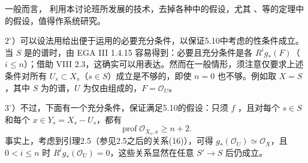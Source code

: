 一般而言，
利用本讨论班所发展的技术，去掉各种中的假设，尤其 、等的定理中的假设，值得作系统研究。

$2^\circ$）可以设法用给出便于运用的必要充分条件，以保证5.10中考虑的性条件成立。当 $S$ 是的谱时，由 EGA III 1.4.15 容易得到：必要且充分条件是各 $R^ig_*(F)$（$i\leq n$）；借助 VIII 2.3，这确实可以用表达。然而在一般情形，须注意仅要求上述条件对所有 $U_s\subset X_s$（$s\in S$）成立是不够的，即使 $n=0$ 也不够。例如取 $X=S$，其中 $S$ 为的谱，$U$ 为仅由组成的，$F=\mathcal O_U$。

$3^\circ$）不过，下面有一个充分条件，保证满足5.10的假设：只须 $f$ ，且对每个 $s\in S$ 和每个 $x\in Y_s=X_s-U_s$，都有
\[
 \operatorname{prof}\mathcal O_{X_s,x}\geq n+2.
\]
事实上，考虑到引理2.5（参见2.5之后的关系(16)），可得 $g_*(\mathcal O_U)\simeq\mathcal O_X$，且 $0<i\leq n$ 时 $R^ig_*(\mathcal O_U)=0$，这些关系显然在任意 $S'\to S$ 后仍成立。
